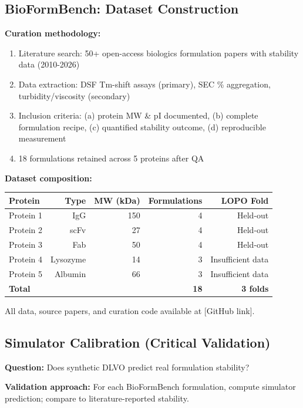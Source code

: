 \documentclass[11pt]{article}
\begin{document}
\subsection{BioFormBench: Dataset Construction}

\textbf{Curation methodology:}
\begin{enumerate}
    \item Literature search: 50+ open-access biologics formulation papers with stability data (2010-2026)
    \item Data extraction: DSF Tm-shift assays (primary), SEC \% aggregation, turbidity/viscosity (secondary)
    \item Inclusion criteria: (a) protein MW \& pI documented, (b) complete formulation recipe, (c) quantified stability outcome, (d) reproducible measurement
    \item 18 formulations retained across 5 proteins after QA
\end{enumerate}

\textbf{Dataset composition:}
\begin{table}[h]
\centering
\begin{tabular}{lrrrr}
\toprule
\textbf{Protein} & \textbf{Type} & \textbf{MW (kDa)} & \textbf{Formulations} & \textbf{LOPO Fold} \\
\midrule
Protein 1 & IgG & 150 & 4 & Held-out \\
Protein 2 & scFv & 27 & 4 & Held-out \\
Protein 3 & Fab & 50 & 4 & Held-out \\
Protein 4 & Lysozyme & 14 & 3 & Insufficient data \\
Protein 5 & Albumin & 66 & 3 & Insufficient data \\
\midrule
\textbf{Total} & & & \textbf{18} & \textbf{3 folds} \\
\bottomrule
\end{tabular}
\end{table}

All data, source papers, and curation code available at [GitHub link].

\subsection{Simulator Calibration (Critical Validation)}

\textbf{Question:} Does synthetic DLVO predict real formulation stability?

\textbf{Validation approach:} For each BioFormBench formulation, compute simulator prediction; compare to literature-reported stability.
\end{document}
